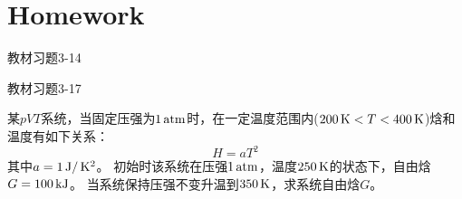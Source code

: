 \documentclass[CJK]{beamer}
\begin{document}
\begin{frame}
  \chtitle{}
  \bch
  \ech
\end{frame}


\begin{frame}
  \chtitle{}
  \bch
  \ech
\end{frame}

\begin{frame}
  \chtitle{}
  \bch
  \ech
\end{frame}

\section{Homework}

\begin{frame}
  \bch
  \bitem
\item{教材习题3-14}
\item{教材习题3-17}
\item{某$pVT$系统，当固定压强为$1\,\mathrm{atm}$时，在一定温度范围内($200\,\mathrm{K} < T< 400 \,\mathrm{K}$)焓和温度有如下关系：
  $$H =  aT^2 $$
  其中$a=1 \,\mathrm{J}/\,\mathrm{K}^2$。
  初始时该系统在压强$1\,\mathrm{atm}$，温度$250\,\mathrm{K}$的状态下，自由焓$G = 100 \,\mathrm{kJ}$。
  当系统保持压强不变升温到$350\,\mathrm{K}$，求系统自由焓$G$。
}
  \eitem
  \ech
\end{frame}
\end{document}
